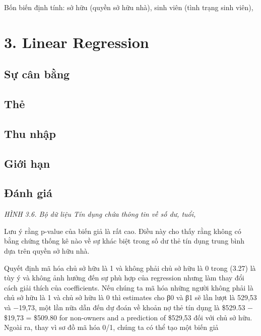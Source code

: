 Bốn biến định tính: sở hữu (quyền sở hữu nhà), sinh viên (tình trạng sinh viên),

\section{3. Linear Regression}

\subsection{Sự cân bằng}

\subsection{Thẻ}

\subsection{Thu nhập}

\subsection{Giới hạn}

\subsection{Đánh giá}

\noindent\textit{HÌNH 3.6. Bộ dữ liệu Tín dụng chứa thông tin về số dư, tuổi,}

Lưu ý rằng p-value của biến giả là rất cao. Điều này cho thấy rằng không có bằng chứng thống kê nào về sự khác biệt trong số dư thẻ tín dụng trung bình dựa trên quyền sở hữu nhà.

Quyết định mã hóa chủ sở hữu là 1 và không phải chủ sở hữu là 0 trong (3.27) là tùy ý và không ảnh hưởng đến sự phù hợp của regression nhưng làm thay đổi cách giải thích của coefficients. Nếu chúng ta mã hóa những người không phải là chủ sở hữu là 1 và chủ sở hữu là 0 thì estimates cho β0 và β1 sẽ lần lượt là 529,53 và −19,73, một lần nữa dẫn đến dự đoán về khoản nợ thẻ tín dụng là \$529.53 −\$19,73 = \$509.80 for non-owners and a prediction of \$529,53 đối với chủ sở hữu. Ngoài ra, thay vì sơ đồ mã hóa 0/1, chúng ta có thể tạo một biến giả

